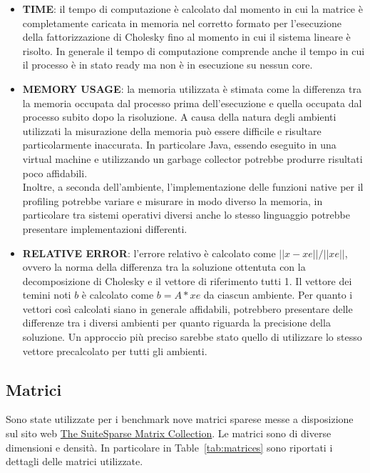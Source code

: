 \documentclass[a4paper, 12pt]{article}
\begin{document}
            \begin{itemize}
                \item \textbf{TIME}: il tempo di computazione è calcolato dal momento in cui la matrice è completamente
                caricata in memoria nel corretto formato per l'esecuzione della fattorizzazione di Cholesky fino al 
                momento in cui il sistema lineare è risolto. In generale il tempo di computazione comprende anche il 
                tempo in cui il processo è in stato ready ma non è in esecuzione su nessun core.
                \item \textbf{MEMORY USAGE}: la memoria utilizzata è stimata come la differenza tra la memoria occupata 
                dal processo prima dell'esecuzione e quella occupata dal processo subito dopo la risoluzione.
                A causa della natura degli ambienti utilizzati la misurazione della memoria può essere difficile e 
                risultare particolarmente inaccurata. In particolare Java, essendo eseguito in una virtual machine e
                utilizzando un garbage collector potrebbe produrre risultati poco affidabili.\\
                Inoltre, a seconda dell'ambiente, l'implementazione delle funzioni native per il profiling potrebbe 
                variare e misurare in modo diverso la memoria, in particolare tra sistemi operativi diversi anche lo 
                stesso linguaggio potrebbe presentare implementazioni differenti.
                \item \textbf{RELATIVE ERROR}: l'errore relativo è calcolato come $||x-xe||/||xe||$, ovvero la norma 
                della differenza tra la soluzione ottentuta con la decomposizione di Cholesky e il vettore di 
                riferimento tutti 1. Il vettore dei temini noti $b$ è calcolato come $b = A*xe$ da ciascun ambiente.
                Per quanto i vettori così calcolati siano in generale affidabili, potrebbero presentare delle differenze
                tra i diversi ambienti per quanto riguarda la precisione della soluzione. Un approccio più preciso 
                sarebbe stato quello di utilizzare lo stesso vettore precalcolato per tutti gli ambienti.
            \end{itemize}

        \subsection{Matrici}
            Sono state utilizzate per i benchmark nove matrici sparese messe a disposizione sul sito web 
            \href{https://sparse.tamu.edu/}{The SuiteSparse Matrix Collection}. Le matrici sono di diverse dimensioni 
            e densità. In particolare in Table~\ref{tab:matrices} sono riportati i dettagli delle matrici utilizzate.
\end{document}
